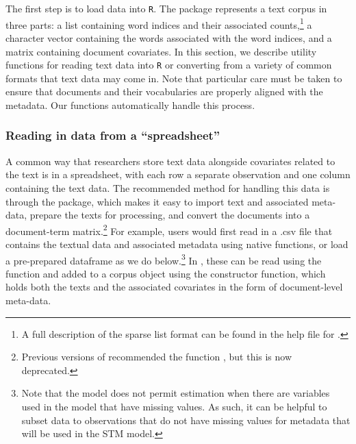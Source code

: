 \documentclass[article,shortnames]{jss}
\begin{document}
The first step is to load data into \texttt{R}. The  package represents a text corpus in three parts: a  list containing word indices and their associated counts,\footnote{A full description of the sparse list format can be found in the help file for .} a  character vector containing the words associated with the word indices, and a  matrix containing document covariates. In this section, we describe utility functions for reading text data into \texttt{R} or converting from a variety of common formats that text data may come in. Note that particular care must be taken to ensure that documents and their vocabularies are properly aligned with the metadata. Our functions automatically handle this process.




\subsubsection{Reading in data from a ``spreadsheet''}

A common way that researchers store text data alongside covariates related to the text is in a spreadsheet, with each row a separate observation and one column containing the text data. The recommended method for handling this data is through the  package, which makes it easy to import text and associated meta-data, prepare the texts for processing, and convert the documents into a document-term matrix.\footnote{Previous versions of  recommended the function , but this is now deprecated.}  For example, users would first read in a .csv file that contains the textual data and associated metadata using native  functions, or load a pre-prepared dataframe as we do below.\footnote{Note that the model does not permit estimation when there are variables used in the model that have missing values. As such, it can be helpful to subset data to observations that do not have missing values for metadata that will be used in the STM model.}  In , these can be read using the  function and added to a corpus object using the  constructor function, which holds both the texts and the associated covariates in the form of document-level meta-data.
\end{document}

